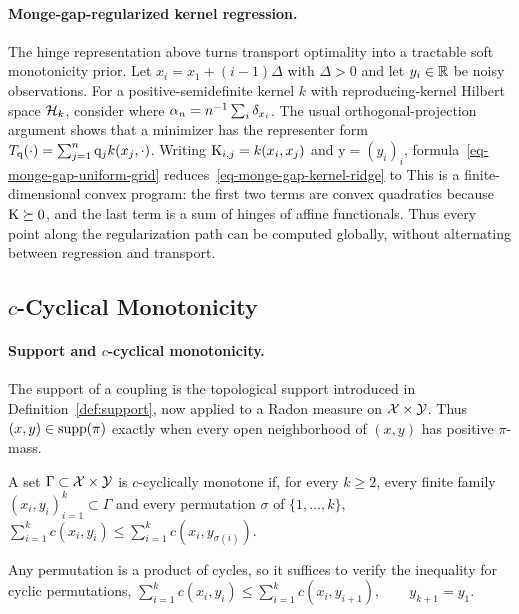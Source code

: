\paragraph{Monge-gap-regularized kernel regression.}\label{par-monge-gap-kernel-regression}
The hinge representation above turns transport optimality into a tractable soft monotonicity prior. Let $x_i=x_1+(i-1)\Delta$ with $\Delta>0$ and let $y_i\in\mathbb{R}$ be noisy observations. For a positive-semidefinite kernel $k$ with reproducing-kernel Hilbert space $\mathcal{H}_k$, consider
where $\alpha_n=n^{-1}\sum_i\delta_{x_i}$. The usual orthogonal-projection argument shows that a minimizer has the representer form $T_{\mathrm{q}}(\cdot)=\sum_{j=1}^n\mathrm{q}_j k(x_j,\cdot)$. Writing $\mathrm{K}_{i,j}=k(x_i,x_j)$ and $\mathrm y=(y_i)_i$, formula~\eqref{eq-monge-gap-uniform-grid} reduces~\eqref{eq-monge-gap-kernel-ridge} to
This is a finite-dimensional convex program: the first two terms are convex quadratics because $\mathrm{K}\succeq0$, and the last term is a sum of hinges of affine functionals. Thus every point along the regularization path can be computed globally, without alternating between regression and transport.

\subsection{\texorpdfstring{$c$}{c}-Cyclical Monotonicity}
\label{sec-cyclical-monotonicity}
\paragraph{\texorpdfstring{Support and $c$-cyclical monotonicity.}{Support and c-cyclical monotonicity.}}
The support of a coupling is the topological support introduced in Definition~\ref{def:support}, now applied to a Radon measure on $\mathcal{X}\times\mathcal{Y}$. Thus $(x,y)\in\operatorname{supp}(\pi)$ exactly when every open neighborhood of $(x,y)$ has positive $\pi$-mass.

\begin{defn}\label{def:ccm}
A set $\Gamma\subset\mathcal{X}\times\mathcal{Y}$ is $c$-cyclically monotone if, for every $k\geq2$, every finite family $(x_i,y_i)_{i=1}^k\subset\Gamma$ and every permutation $\sigma$ of $\{1,\ldots,k\}$,
\(\sum_{i=1}^k c(x_i,y_i) \leq \sum_{i=1}^k c(x_i,y_{\sigma(i)}).\)
\end{defn}
Any permutation is a product of cycles, so it suffices to verify the inequality for cyclic permutations, \(\sum_{i=1}^k c(x_i,y_i) \leq \sum_{i=1}^k c(x_i,y_{i+1}), \qquad y_{k+1}=y_1.\)
